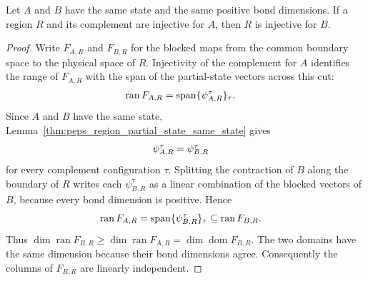 \begin{lemma}%
    \label{thm:peps_regional_injectivity_from_state}
    \leanok

    Let $A$ and $B$ have the same state and the same positive bond
    dimensions. If a region $R$ and its complement are injective for $A$,
    then $R$ is injective for $B$.
\end{lemma}
\begin{proof}\leanok
    Write $F_{A,R}$ and $F_{B,R}$ for the blocked maps from the common
    boundary space to the physical space of $R$. Injectivity of the
    complement for $A$ identifies the range of $F_{A,R}$ with the span of
    the partial-state vectors across this cut:
    \begin{align}
        \operatorname{ran}F_{A,R}
         & =\operatorname{span}\{\psi^\tau_{A,R}\}_\tau.
        \notag
    \end{align}
    Since $A$ and $B$ have the same state, Lemma~\ref{thm:peps_region_partial_state_same_state}
    gives
    \begin{align}
        \psi^\tau_{A,R}
         & =\psi^\tau_{B,R}
        \notag
    \end{align}
    for every complement configuration $\tau$. Splitting the contraction of
    $B$ along the boundary of $R$ writes each $\psi^\tau_{B,R}$ as a linear
    combination of the blocked vectors of $B$, because every bond dimension
    is positive. Hence
    \begin{align}
        \operatorname{ran}F_{A,R}
         & =\operatorname{span}\{\psi^\tau_{B,R}\}_\tau
        \subseteq\operatorname{ran}F_{B,R}.
        \notag
    \end{align}
    Thus $\dim\operatorname{ran}F_{B,R}\ge
        \dim\operatorname{ran}F_{A,R}=\dim\operatorname{dom}F_{B,R}$.
    The two domains have the same dimension because their bond dimensions
    agree. Consequently the columns of $F_{B,R}$ are linearly independent.
\end{proof}

